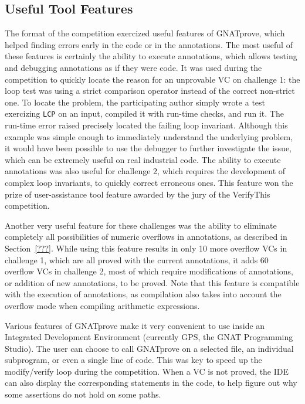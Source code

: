 \documentclass[sttt,draft]{svjour}
\newcommand{\gnatprove}{GNATprove\xspace}
\begin{document}
\subsection{Useful Tool Features}

The format of the competition exercized useful features of \gnatprove, which
helped finding errors early in the code or in the annotations. The most useful
of these features is certainly the ability to execute annotations, which allows
testing and debugging annotations as if they were code. It was used during the
competition to quickly locate the reason for an unprovable VC on challenge 1:
the loop test was using a strict comparison operator instead of the correct
non-strict one. To locate the problem, the participating author simply wrote a
test exercizing \verb|LCP| on an input, compiled it with run-time checks, and
run it. The run-time error raised precisely located the failing loop
invariant. Although this example was simple enough to immediately understand
the underlying problem, it would have been possible to use the debugger to
further investigate the issue, which can be extremely useful on real industrial
code. The ability to execute annotations was also useful for challenge 2, which
requires the development of complex loop invariants, to quickly correct
erroneous ones. This feature won the prize of user-assistance tool feature
awarded by the jury of the VerifyThis competition.

Another very useful feature for these challenges was the ability to eliminate
completely all possibilities of numeric overflows in annotations, as described
in Section~\ref{???}. While using this feature results in only 10 more overflow
VCs in challenge 1, which are all proved with the current annotations, it adds
60 overflow VCs in challenge 2, most of which require modifications of
annotations, or addition of new annotations, to be proved. Note that this
feature is compatible with the execution of annotations, as compilation also
takes into account the overflow mode when compiling arithmetic expressions.

Various features of \gnatprove make it very convenient to use inside an
Integrated Development Environment (currently GPS, the GNAT Programming
Studio). The user can choose to call \gnatprove on a selected file, an
individual subprogram, or even a single line of code. This was key to speed up
the modify/verify loop during the competition. When a VC is not proved, the IDE
can also display the corresponding statements in the code, to help figure out
why some assertions do not hold on some paths.
\end{document}
